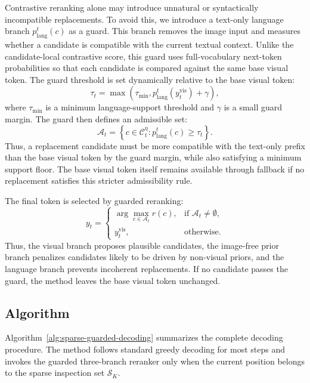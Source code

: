 \documentclass[11pt]{article}
\begin{document}
  Contrastive reranking alone may introduce unnatural or syntactically incompatible replacements. To avoid this, we introduce a text-only language branch $p_{\mathrm{lang}}^t(c)$ as a guard. This branch removes the
  image input and measures whether a candidate is compatible with the current textual context.
  Unlike the candidate-local contrastive score, this guard uses full-vocabulary next-token probabilities so that each candidate is compared against the same base visual token.
  The guard threshold is set dynamically relative to the base visual token:
  \begin{equation}
  \tau_t =
  \max\left(
  \tau_{\min},
  p_{\mathrm{lang}}^t(y_t^{\mathrm{vis}}) + \gamma
  \right),
  \label{eq:text_guard_threshold}
  \end{equation}
  where $\tau_{\min}$ is a minimum language-support threshold and $\gamma$ is a small guard margin. The guard then defines an admissible set:
  \begin{equation}
  \mathcal{A}_t =
  \left\{
  c \in \mathcal{C}_t^{\eta} :
  p_{\mathrm{lang}}^t(c) \ge \tau_t
  \right\}.
  \end{equation}
  Thus, a replacement candidate must be more compatible with the text-only prefix than the base visual token by the guard margin, while also satisfying a minimum support floor.
  The base visual token itself remains available through fallback if no replacement satisfies this stricter admissibility rule.

  The final token is selected by guarded reranking:
  \begin{equation}
  y_t =
  \begin{cases}
  \displaystyle
  \arg\max_{c \in \mathcal{A}_t} r(c),
  & \text{if } \mathcal{A}_t \neq \emptyset,\\[6pt]
  y_t^{\mathrm{vis}},
  & \text{otherwise}.
  \end{cases}
  \end{equation}
  Thus, the visual branch proposes plausible candidates, the image-free prior branch penalizes candidates likely to be driven by non-visual priors, and the language branch prevents incoherent replacements. If no
  candidate passes the guard, the method leaves the base visual token unchanged.

\subsection{Algorithm}

  Algorithm~\ref{alg:sparse-guarded-decoding} summarizes the complete decoding procedure. The method follows standard greedy decoding for most steps and invokes the guarded three-branch reranker only when the current
  position belongs to the sparse inspection set $\mathcal{S}_K$.
\end{document}
